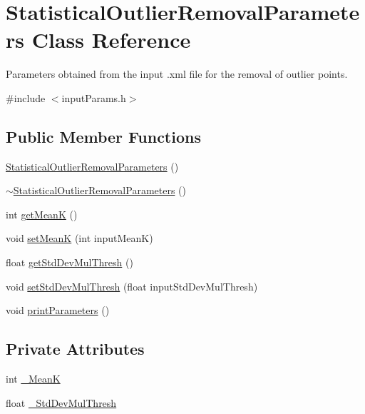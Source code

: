 \hypertarget{classStatisticalOutlierRemovalParameters}{\section{Statistical\-Outlier\-Removal\-Parameters Class Reference}
\label{classStatisticalOutlierRemovalParameters}
}


Parameters obtained from the input .xml file for the removal of outlier points.  




{\ttfamily \#include $<$input\-Params.\-h$>$}

\subsection*{Public Member Functions}
\begin{DoxyCompactItemize}
\item 
\hyperlink{classStatisticalOutlierRemovalParameters_acd15b20ad899d54495f614745ea8f44b}{Statistical\-Outlier\-Removal\-Parameters} ()
\item 
\hyperlink{classStatisticalOutlierRemovalParameters_a2ce8559d2f4a8e27fa3c7f341804ec93}{$\sim$\-Statistical\-Outlier\-Removal\-Parameters} ()
\item 
int \hyperlink{classStatisticalOutlierRemovalParameters_ab6daca6154060a26f6d17ef8e31ebb87}{get\-Mean\-K} ()
\item 
void \hyperlink{classStatisticalOutlierRemovalParameters_afc264c40e090abb3c14bd9c9bb7a5dbe}{set\-Mean\-K} (int input\-Mean\-K)
\item 
float \hyperlink{classStatisticalOutlierRemovalParameters_a4f7dda0fc791b9f3953df98e65935b7e}{get\-Std\-Dev\-Mul\-Thresh} ()
\item 
void \hyperlink{classStatisticalOutlierRemovalParameters_a109f13105d1042436d3b4399385f16f9}{set\-Std\-Dev\-Mul\-Thresh} (float input\-Std\-Dev\-Mul\-Thresh)
\item 
void \hyperlink{classStatisticalOutlierRemovalParameters_a6c0eb4e8df6d31e7fbd839c1525c30bc}{print\-Parameters} ()
\end{DoxyCompactItemize}
\subsection*{Private Attributes}
\begin{DoxyCompactItemize}
\item 
int \hyperlink{classStatisticalOutlierRemovalParameters_a55ceb4510332a315c31eeaf852e1d142}{\-\_\-\-Mean\-K}
\item 
float \hyperlink{classStatisticalOutlierRemovalParameters_ab299f0e6f831b50b4ecf59be328f7624}{\-\_\-\-Std\-Dev\-Mul\-Thresh}
\end{DoxyCompactItemize}



